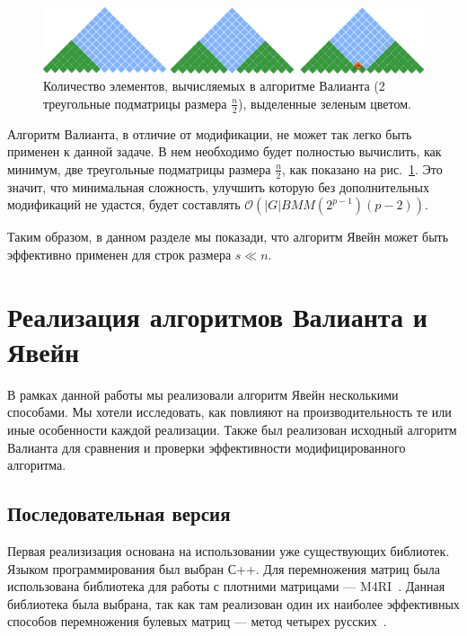 \documentclass[14pt]{matmex-diploma-custom}
\begin{document}
\begin{figure}[h]
\vspace{3mm}
 \begin{center}
 \includegraphics[width=14cm]{valsubstring.pdf}
    \caption{Количество элементов, вычисляемых в алгоритме Валианта (2  треугольные подматрицы размера $\frac{n}{2}$), выделенные зеленым цветом.}
    \label{fig5}
 \end{center}
\vspace{-8mm}
\end{figure}

Алгоритм Валианта, в отличие от модификации, не может так легко быть применен к данной задаче. В нем необходимо будет полностью вычислить, как минимум, две треугольные подматрицы размера $\frac{n}{2}$, как показано на рис.~\ref{fig5}.
Это значит, что минимальная сложность, улучшить которую без дополнительных модификаций не удастся, будет составлять $\mathcal{O}(|G|BMM(2^{p - 1})(p - 2))$.

Таким образом, в данном разделе мы показади, что алгоритм Явейн может быть эффективно применен для строк размера $s \ll n$.



\section{Реализация алгоритмов Валианта и Явейн}

В рамках данной работы мы реализовали алгоритм Явейн несколькими способами. Мы хотели исследовать, как повлияют на производительность те или иные особенности каждой реализации. Также был реализован исходный алгоритм Валианта для сравнения и проверки эффективности модифицированного алгоритма.

\subsection{Последовательная версия}

Первая реализизация основана на использовании уже существующих библиотек. 
Языком программирования был выбран С++. Для перемножения матриц была использована библиотека для работы с плотними матрицами --- M4RI~\cite{M4RI}. 
Данная библиотека была выбрана, так как там реализован один их наиболее эффективных способов перемножения булевых матриц --- метод четырех русских~\cite{albrechtefficient, arlazarov1970economical}.  
\end{document}
